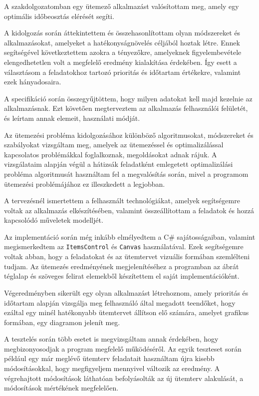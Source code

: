 
A szakdolgozatomban egy ütemező alkalmazást valósítottam meg, amely egy optimális időbeosztás elérését segíti.

A kidolgozás során áttekintettem és összehasonlítottam olyan módszereket és alkalmazásokat, amelyeket a hatékonyságnövelés céljából hoztak létre. Ennek segítségével következtettem azokra a tényezőkre, amelyeknek figyelembevétele elengedhetetlen volt a megfelelő eredmény kialakítása érdekében.
Így esett a választásom a feladatokhoz tartozó prioritás és időtartam értékekre, valamint ezek hányadosaira.

A specifikáció során összegyűjtöttem, hogy milyen adatokat kell majd kezelnie az alkalmazásnak. Ezt követően megterveztem az alkalmazás felhasználói felületét, és leírtam annak elemeit, használati módját.

Az ütemezési probléma kidolgozásához különböző algoritmusokat, módszereket és szabályokat vizsgáltam meg, amelyek az ütemezéssel és optimalizálással kapcsolatos problémákkal foglalkoznak, megoldásokat adnak rájuk. A vizsgálataim alapján végül a hátizsák feladatként emlegetett optimalizálási probléma algoritmusát használtam fel a megvalósítás során, mivel a programom ütemezési problémájához ez illeszkedett a legjobban.

A tervezésnél ismertettem a felhasznált technológiákat, amelyek segítségemre voltak az alkalmazás elkészítésében, valamint összeállítottam a feladatok és hozzá kapcsolódó műveletek modelljét.

Az implementáció során még inkább elmélyedtem a C\# sajátosságaiban, valamint megismerkedtem az \texttt{ItemsControl} és \texttt{Canvas} használatával. Ezek segítségemre voltak abban, hogy a feladatokat és az ütemtervet vizuális formában szemlélteni tudjam.
Az ütemezés eredményének megjelenítéséhez a programban az ábrát téglalap és szöveges felirat elemekből készítettem el saját implementációként.

Végeredményben sikerült egy olyan alkalmazást létrehoznom, amely prioritás és időtartam alapján vizsgálja meg felhasználó által megadott teendőket, hogy ezáltal egy minél hatékonyabb ütemtervet állítson elő számára, amelyet grafikus formában, egy diagramon jelenít meg.

A tesztelés során több esetet is megvizsgáltam annak érdekében, hogy megbizonyosodjak a program megfelelő működéséről. Az egyik teszteset során például egy már meglévő ütemterv feladatait használtam újra kisebb módosításokkal, hogy megfigyeljem mennyivel változik az eredmény. A végrehajtott módosítások láthatóan befolyásolták az új ütemterv alakulását, a módosítások mértékének megfelelően.

